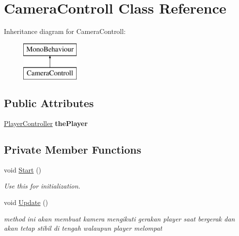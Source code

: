 \hypertarget{class_camera_controll}{}\section{Camera\+Controll Class Reference}
\label{class_camera_controll}
Inheritance diagram for Camera\+Controll\+:\begin{figure}[H]
\begin{center}
\leavevmode
\includegraphics[height=2.000000cm]{class_camera_controll}
\end{center}
\end{figure}
\subsection*{Public Attributes}
\begin{DoxyCompactItemize}
\item 
\hypertarget{class_camera_controll_aaf8cb2822b242349a0d58e22da4d8bd8}{}\label{class_camera_controll_aaf8cb2822b242349a0d58e22da4d8bd8} 
\hyperlink{class_player_controller}{Player\+Controller} {\bfseries the\+Player}
\end{DoxyCompactItemize}
\subsection*{Private Member Functions}
\begin{DoxyCompactItemize}
\item 
\hypertarget{class_camera_controll_ac798631e3e2fe815a27e363c1c4423dd}{}\label{class_camera_controll_ac798631e3e2fe815a27e363c1c4423dd} 
void \hyperlink{class_camera_controll_ac798631e3e2fe815a27e363c1c4423dd}{Start} ()
\begin{DoxyCompactList}\small\item\em Use this for initialization. \end{DoxyCompactList}\item 
void \hyperlink{class_camera_controll_a79756d5ea4d853ab67752d483395b192}{Update} ()
\begin{DoxyCompactList}\small\item\em method ini akan membuat kamera mengikuti gerakan player saat bergerak dan akan tetap stibil di tengah walaupun player melompat \end{DoxyCompactList}\end{DoxyCompactItemize}
